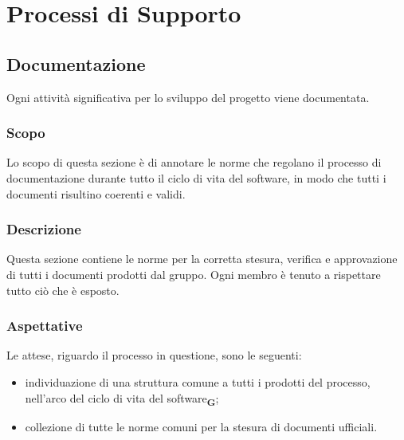 \section{Processi di Supporto}
\subsection{Documentazione}
Ogni attività significativa per lo sviluppo del progetto viene documentata.
\subsubsection{Scopo}
Lo scopo di questa sezione è di annotare le norme che regolano il processo di documentazione durante tutto il ciclo di vita del software, in modo che tutti i documenti risultino coerenti e validi.
\subsubsection{Descrizione}
Questa sezione contiene le norme per la corretta stesura, verifica e approvazione di tutti i documenti prodotti dal gruppo. Ogni membro è tenuto a rispettare tutto ciò che è esposto.
\subsubsection{Aspettative}
Le attese, riguardo il processo in questione, sono le seguenti:
\begin{itemize}
    \item individuazione di una struttura comune a tutti i prodotti del processo, nell'arco del ciclo di vita del software\textsubscript{\textbf{G}};
    \item collezione di tutte le norme comuni per la stesura di documenti ufficiali.
\end{itemize}
